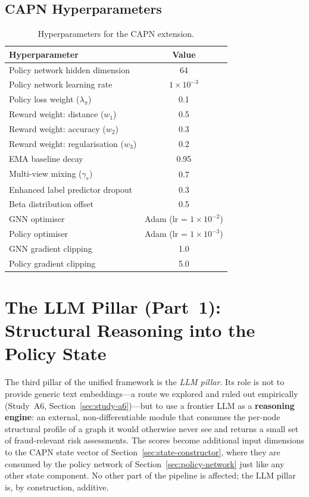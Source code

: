 \subsection{CAPN Hyperparameters}
\label{sec:capn-hyperparams}

\begin{table}[h!]
\centering
\begin{tabular}{|l|c|}
\hline
\textbf{Hyperparameter} & \textbf{Value} \\
\hline
Policy network hidden dimension & 64 \\
Policy network learning rate & \( 1 \times 10^{-3} \) \\
Policy loss weight (\( \lambda_\pi \)) & 0.1 \\
Reward weight: distance (\( w_1 \)) & 0.5 \\
Reward weight: accuracy (\( w_2 \)) & 0.3 \\
Reward weight: regularisation (\( w_3 \)) & 0.2 \\
EMA baseline decay & 0.95 \\
Multi-view mixing (\( \gamma_r \)) & 0.7 \\
Enhanced label predictor dropout & 0.3 \\
Beta distribution offset & 0.5 \\
GNN optimiser & Adam (lr = \( 1 \times 10^{-2} \)) \\
Policy optimiser & Adam (lr = \( 1 \times 10^{-3} \)) \\
GNN gradient clipping & 1.0 \\
Policy gradient clipping & 5.0 \\
\hline
\end{tabular}
\caption{Hyperparameters for the CAPN extension.}
\end{table}


\section{The LLM Pillar (Part~1): Structural Reasoning into the Policy State}
\label{sec:llm-pillar-1}
\label{sec:llm-reasoning}

The third pillar of the unified framework is the \emph{LLM pillar}. Its role is not to provide generic text embeddings---a route we explored and ruled out empirically (Study~A6, Section~\ref{sec:study-a6})---but to use a frontier LLM as a \textbf{reasoning engine}: an external, non-differentiable module that consumes the per-node structural profile of a graph it would otherwise never see and returns a small set of fraud-relevant risk assessments. The scores become additional input dimensions to the CAPN state vector of Section~\ref{sec:state-constructor}, where they are consumed by the policy network of Section~\ref{sec:policy-network} just like any other state component. No other part of the pipeline is affected; the LLM pillar is, by construction, additive.

